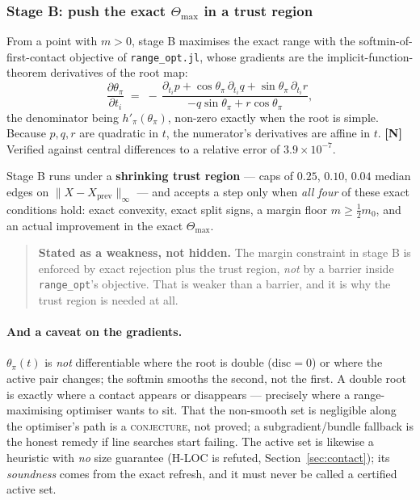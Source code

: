 \documentclass[11pt,a4paper]{article}
\theoremstyle{definition}
\newcommand{\Tmax}{\Theta_{\max}}
\newcommand{\file}[1]{\texttt{\small #1}}
\begin{document}
\subsubsection{Stage B: push the exact \texorpdfstring{$\Tmax$}{Theta max} in a trust region}

From a point with $m>0$, stage B maximises the exact range with the softmin-of-first-contact
objective of \file{range\_opt.jl}, whose gradients are the implicit-function-theorem
derivatives of the root map:
\begin{equation}
\frac{\partial\theta_\pi}{\partial t_i}
\;=\; -\,\frac{\partial_{t_i}p + \cos\theta_\pi\,\partial_{t_i}q + \sin\theta_\pi\,\partial_{t_i}r}
{-q\sin\theta_\pi + r\cos\theta_\pi} ,
\label{eq:T62}
\end{equation}
the denominator being $h'_\pi(\theta_\pi)$, non-zero exactly when the root is simple. Because
$p,q,r$ are quadratic in $t$, the numerator's derivatives are affine in $t$.
\textbf{[N]} Verified against central differences to a relative error of
$3.9\times10^{-7}$.

Stage B runs under a \textbf{shrinking trust region} --- caps of $0.25$, $0.10$, $0.04$ median
edges on $\|X-X_{\mathrm{prev}}\|_\infty$ --- and accepts a step only when \emph{all four} of
these exact conditions hold: exact convexity, exact split signs, a margin floor
$m\ge\tfrac12 m_0$, and an actual improvement in the exact $\Tmax$.

\begin{quote}
\textbf{Stated as a weakness, not hidden.} The margin constraint in stage B is enforced by
exact rejection plus the trust region, \emph{not} by a barrier inside \file{range\_opt}'s
objective. That is weaker than a barrier, and it is why the trust region is needed at all.
\end{quote}

\paragraph{And a caveat on the gradients.} $\theta_\pi(t)$ is \emph{not} differentiable where
the root is double ($\mathrm{disc}=0$) or where the active pair changes; the softmin smooths
the second, not the first. A double root is exactly where a contact appears or disappears ---
precisely where a range-maximising optimiser wants to sit. That the non-smooth set is
negligible along the optimiser's path is a \textsc{conjecture}, not proved; a
subgradient/bundle fallback is the honest remedy if line searches start failing. The active
set is likewise a heuristic with \emph{no} size guarantee (H-LOC is refuted,
Section~\ref{sec:contact}); its \emph{soundness} comes from the exact refresh, and it must
never be called a certified active set.
\end{document}
